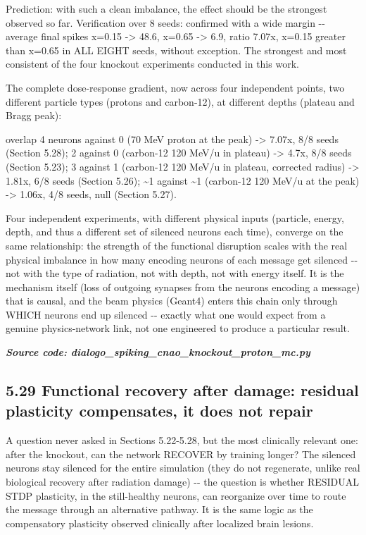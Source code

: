 \documentclass[
  english,
]{article}
\begin{document}
Prediction: with such a clean imbalance, the effect should be the strongest observed so far. Verification over 8 seeds: confirmed with a wide margin -\/- average final spikes x=0.15 -\textgreater{} 48.6, x=0.65 -\textgreater{} 6.9, ratio 7.07x, x=0.15 greater than x=0.65 in ALL EIGHT seeds, without exception. The strongest and most consistent of the four knockout experiments conducted in this work.

The complete dose-response gradient, now across four independent points, two different particle types (protons and carbon-12), at different depths (plateau and Bragg peak):

overlap 4 neurons against 0 (70 MeV proton at the peak) -\textgreater{} 7.07x, 8/8 seeds (Section 5.28); 2 against 0 (carbon-12 120 MeV/u in plateau) -\textgreater{} 4.7x, 8/8 seeds (Section 5.23); 3 against 1 (carbon-12 120 MeV/u in plateau, corrected radius) -\textgreater{} 1.81x, 6/8 seeds (Section 5.26); \textasciitilde1 against \textasciitilde1 (carbon-12 120 MeV/u at the peak) -\textgreater{} 1.06x, 4/8 seeds, null (Section 5.27).

Four independent experiments, with different physical inputs (particle, energy, depth, and thus a different set of silenced neurons each time), converge on the same relationship: the strength of the functional disruption scales with the real physical imbalance in how many encoding neurons of each message get silenced -\/- not with the type of radiation, not with depth, not with energy itself. It is the mechanism itself (loss of outgoing synapses from the neurons encoding a message) that is causal, and the beam physics (Geant4) enters this chain only through WHICH neurons end up silenced -\/- exactly what one would expect from a genuine physics-network link, not one engineered to produce a particular result.

\textit{\textbf{Source code: dialogo\_\allowbreak{}spiking\_\allowbreak{}cnao\_\allowbreak{}knockout\_\allowbreak{}proton\_\allowbreak{}mc.py}}


\subsection{5.29 Functional recovery after damage: residual plasticity compensates, it does not repair}\label{functional-recovery-after-damage-residual-plasticity-compensates-it-does-not-repair}

A question never asked in Sections 5.22-5.28, but the most clinically relevant one: after the knockout, can the network RECOVER by training longer? The silenced neurons stay silenced for the entire simulation (they do not regenerate, unlike real biological recovery after radiation damage) -\/- the question is whether RESIDUAL STDP plasticity, in the still-healthy neurons, can reorganize over time to route the message through an alternative pathway. It is the same logic as the compensatory plasticity observed clinically after localized brain lesions.
\end{document}

